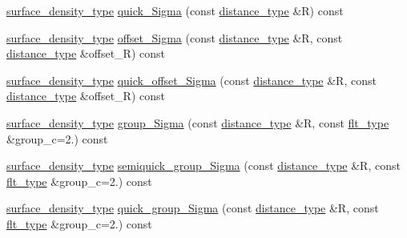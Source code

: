 \begin{DoxyCompactItemize}
\hyperlink{namespaceIceBRG_a80c597ef5ba0a32491d32a9f0083b02d}{surface\-\_\-density\-\_\-type} \hyperlink{classIceBRG_1_1lensing__profile__extension_ab379ef52392e02006be17d63dc9fc143}{quick\-\_\-\-Sigma} (const \hyperlink{namespaceIceBRG_a45499647eb87e24c10ab32c628711cec}{distance\-\_\-type} \&R) const 
\item 
\hyperlink{namespaceIceBRG_a80c597ef5ba0a32491d32a9f0083b02d}{surface\-\_\-density\-\_\-type} \hyperlink{classIceBRG_1_1lensing__profile__extension_a6d741bd28b43b2ac39878dc2330920f8}{offset\-\_\-\-Sigma} (const \hyperlink{namespaceIceBRG_a45499647eb87e24c10ab32c628711cec}{distance\-\_\-type} \&R, const \hyperlink{namespaceIceBRG_a45499647eb87e24c10ab32c628711cec}{distance\-\_\-type} \&offset\-\_\-\-R) const 
\item 
\hyperlink{namespaceIceBRG_a80c597ef5ba0a32491d32a9f0083b02d}{surface\-\_\-density\-\_\-type} \hyperlink{classIceBRG_1_1lensing__profile__extension_ad923f4a13fd5de67e32540e14ccff912}{quick\-\_\-offset\-\_\-\-Sigma} (const \hyperlink{namespaceIceBRG_a45499647eb87e24c10ab32c628711cec}{distance\-\_\-type} \&R, const \hyperlink{namespaceIceBRG_a45499647eb87e24c10ab32c628711cec}{distance\-\_\-type} \&offset\-\_\-\-R) const 
\item 
\hyperlink{namespaceIceBRG_a80c597ef5ba0a32491d32a9f0083b02d}{surface\-\_\-density\-\_\-type} \hyperlink{classIceBRG_1_1lensing__profile__extension_a7a16cb407e28ed4b6969e73c7c47d97d}{group\-\_\-\-Sigma} (const \hyperlink{namespaceIceBRG_a45499647eb87e24c10ab32c628711cec}{distance\-\_\-type} \&R, const \hyperlink{lib_2IceBRG__main_2common_8h_ad0f130a56eeb944d9ef2692ee881ecc4}{flt\-\_\-type} \&group\-\_\-c=2.) const 
\item 
\hyperlink{namespaceIceBRG_a80c597ef5ba0a32491d32a9f0083b02d}{surface\-\_\-density\-\_\-type} \hyperlink{classIceBRG_1_1lensing__profile__extension_acd9166e92f17f86129e9eeecdeba2c95}{semiquick\-\_\-group\-\_\-\-Sigma} (const \hyperlink{namespaceIceBRG_a45499647eb87e24c10ab32c628711cec}{distance\-\_\-type} \&R, const \hyperlink{lib_2IceBRG__main_2common_8h_ad0f130a56eeb944d9ef2692ee881ecc4}{flt\-\_\-type} \&group\-\_\-c=2.) const 
\item 
\hyperlink{namespaceIceBRG_a80c597ef5ba0a32491d32a9f0083b02d}{surface\-\_\-density\-\_\-type} \hyperlink{classIceBRG_1_1lensing__profile__extension_a3a0baaa307aa442681088e7a2e771287}{quick\-\_\-group\-\_\-\-Sigma} (const \hyperlink{namespaceIceBRG_a45499647eb87e24c10ab32c628711cec}{distance\-\_\-type} \&R, const \hyperlink{lib_2IceBRG__main_2common_8h_ad0f130a56eeb944d9ef2692ee881ecc4}{flt\-\_\-type} \&group\-\_\-c=2.) const 

\end{DoxyCompactItemize}
